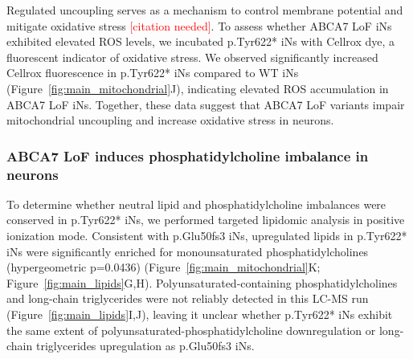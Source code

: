 Regulated uncoupling serves as a mechanism to control membrane potential and mitigate oxidative stress \textcolor{red}{[citation needed]}. To assess whether ABCA7 LoF iNs exhibited elevated ROS levels, we incubated p.Tyr622* iNs with Cellrox dye, a fluorescent indicator of oxidative stress. We observed significantly increased Cellrox fluorescence in p.Tyr622* iNs compared to WT iNs (Figure~\ref{fig:main_mitochondrial}J), indicating elevated ROS accumulation in ABCA7 LoF iNs. Together, these data suggest that ABCA7 LoF variants impair mitochondrial uncoupling and increase oxidative stress in neurons.

\subsubsection{ABCA7 LoF induces phosphatidylcholine imbalance in neurons}
\newcommand{\quoteA}{\textcolor{blue}{Since ABCA7 functions as a lipid transporter, we examined the lipidome using LC-MS. Comparing lipidomic profiles between WT and p.Glu50fs3 iNs revealed significant alterations across multiple lipid classes, including neutral lipids, phospholipids, sphingolipids, and steroids (Figure~\ref{fig:main_lipids}A,B). Among these, triglycerides (TGs)—particularly species enriched in long-chain, predominantly polyunsaturated fatty acids—were frequently altered, showing significant upregulation in p.Glu50fs3 iNs (Figure~\ref{fig:main_lipids}B,C).\label{quoteA-label}}}

\newcommand{\quoteB}{\textcolor{blue}{In line with ABCA7's established role as a phospholipid transporter, several phospholipid species exhibited notable differences (Figure~\ref{fig:main_lipids}B). Phosphatidylcholines (PCs), which are essential structural components of biological membranes and potential ABCA7 substrates \textcolor{red}{[citation needed]}, were most prominently affected; 21 out of 32 detected PC species showed increased abundance in p.Glu50fs3 iNs (Figure~\ref{fig:main_lipids}B). Further analysis based on fatty acid saturation—an important factor influencing membrane fluidity—revealed significant enrichment of saturated (SFA) and monounsaturated (MUFA) PCs among the upregulated species (hypergeometric p=0.0027) (Figure~\ref{fig:main_lipids}D). In contrast, polyunsaturated fatty acid-containing (PUFA) PCs were primarily downregulated (p=0.0148) (Figure~\ref{fig:main_lipids}E,F).}}

To determine whether neutral lipid and phosphatidylcholine imbalances were conserved in p.Tyr622* iNs, we performed targeted lipidomic analysis in positive ionization mode. Consistent with p.Glu50fs3 iNs, upregulated lipids in p.Tyr622* iNs were significantly enriched for monounsaturated phosphatidylcholines (hypergeometric p=0.0436) (Figure~\ref{fig:main_mitochondrial}K; Figure~\ref{fig:main_lipids}G,H). Polyunsaturated-containing phosphatidylcholines and long-chain triglycerides were not reliably detected in this LC-MS run (Figure~\ref{fig:main_lipids}I,J), leaving it unclear whether p.Tyr622* iNs exhibit the same extent of polyunsaturated-phosphatidylcholine downregulation or long-chain triglycerides upregulation as p.Glu50fs3 iNs.

